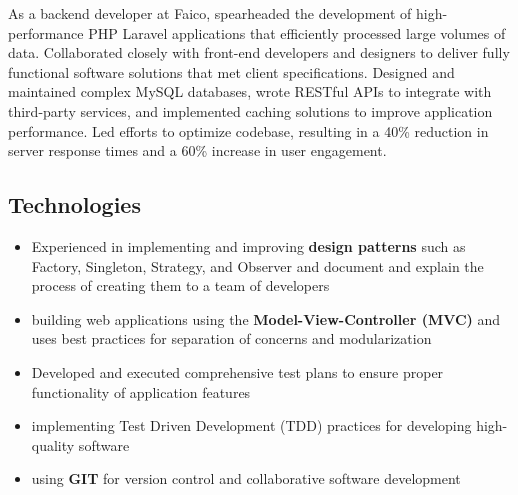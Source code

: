 \documentclass[A4,11pt]{article}
\newcommand{\resumeProjectItem}[1]{
  \item{
    { #1 \vspace{-2pt}}
  }
}
\newcommand{\resumeItemListStart}{\begin{itemize}}
\newcommand{\resumeItemListEnd}{\end{itemize}\vspace{-5pt}}
\begin{document}
	{ 
	As a backend developer at Faico, spearheaded the development of high-performance PHP Laravel applications that efficiently processed large volumes of data. Collaborated closely with front-end developers and designers to deliver fully functional software solutions that met client specifications. Designed and maintained complex MySQL databases, wrote RESTful APIs to integrate with third-party services, and implemented caching solutions to improve application performance. Led efforts to optimize codebase, resulting in a 40\% reduction in server response times and a 60\% increase in user engagement.
	}

	\vspace{5pt}
	


	\vspace{-15pt}
      
      \subsection*{Technologies}
	\vspace{-5pt}
	\resumeItemListStart
	\resumeProjectItem{ Experienced in implementing and improving \textbf{design patterns} such as Factory, Singleton, Strategy, and Observer and document and explain the process of creating them to a team of developers }
     \resumeProjectItem{building web applications using the \textbf{Model-View-Controller (MVC)} and uses best practices for separation of concerns and modularization}
     \resumeProjectItem{Developed and executed comprehensive test plans to ensure proper functionality of application features}
     \resumeProjectItem{  implementing Test Driven Development (TDD) practices for developing high-quality software  }
        
     	\resumeProjectItem{ using \textbf{GIT} for version control and collaborative software development}
      \resumeItemListEnd

     \vspace{-10pt}
\end{document}
